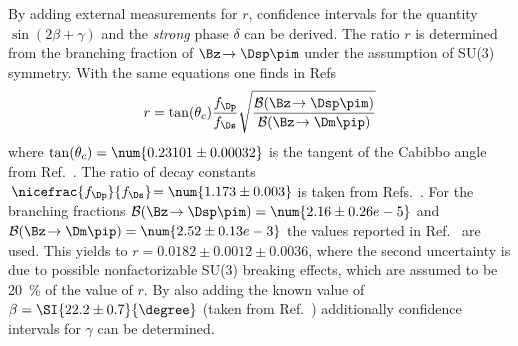 By adding external measurements for $r$, confidence intervals for the quantity $\sin\!\left(2\beta+\gamma\right)$ and the \emph{strong} phase $\delta$ can be derived.
The ratio $r$ is determined from the branching fraction of $\Bz\!\to\Dsp\pim$ under the assumption of SU(3) symmetry.
With the same equations one finds in Refs~\cite{Aubert:2008zi, Das:2010be}
\begin{equation}
r=\tan(\theta_c)\frac{f_\Dp}{f_\Ds}\sqrt{\frac{\mathcal{B}\!\left(\Bz\!\to\Dsp\pim\right)}{\mathcal{B}\!\left(\Bz\!\to\Dm\pip\right)}}
\end{equation}
where $\tan(\theta_c)=\num{0.23101\pm0.00032}$ is the tangent of the Cabibbo angle from Ref.~\cite{CKMfitter2015}.
The ratio of decay constants $\,\nicefrac{f_\Dp}{f_\Ds}\!=\num{1.173\pm0.003}$ is taken from Refs.~\cite{Aoki:2016frl, Bazavov:2014wgs, Carrasco:2014poa}.
For the branching fractions \mbox{$\mathcal{B}\!\left(\Bz\!\to\Dsp\pim\right)=\num{2.16\pm0.26 e-5}$} and \mbox{$\mathcal{B}\!\left(\Bz\!\to\Dm\pip\right)=\num{2.52\pm0.13 e-3}$} the values reported in Ref.~\cite{PDG_2017} are used.
This yields to $r=0.0182\pm0.0012\pm0.0036$, where the second uncertainty is due to possible nonfactorizable SU(3) breaking effects, which are assumed to be \SI{20}{\percent} of the value of $r$.
By also adding the known value of $\beta=\SI{22.2\pm0.7}{\degree}$ (taken from Ref.~\cite{HFLAV2016}) additionally confidence intervals for $\gamma$ can be determined.

